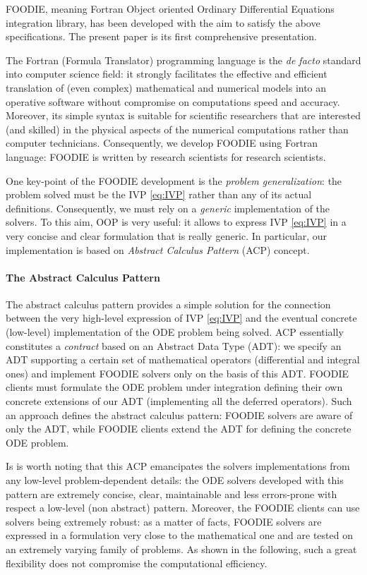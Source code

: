 FOODIE, meaning Fortran Object oriented Ordinary Differential Equations integration library, has been developed with the aim to satisfy the above specifications. The present paper is its first comprehensive presentation.

The Fortran (Formula Translator) programming language is the \emph{de facto} standard into computer science field: it strongly facilitates the effective and efficient translation of (even complex) mathematical and numerical models into an operative software without compromise on computations speed and accuracy. Moreover, its simple syntax is suitable for scientific researchers that are interested (and skilled) in the physical aspects of the numerical computations rather than computer technicians. Consequently, we develop FOODIE using Fortran language: FOODIE is written by research scientists for research scientists.

One key-point of the FOODIE development is the \emph{problem generalization}: the problem solved must be the IVP \ref{eq:IVP} rather than any of its actual definitions. Consequently, we must rely on a \emph{generic} implementation of the solvers. To this aim, OOP is very useful: it allows to express IVP \ref{eq:IVP} in a very concise and clear formulation that is really generic. In particular, our implementation is based on \emph{Abstract Calculus Pattern} (ACP) concept.

\paragraph{The Abstract Calculus Pattern}
The abstract calculus pattern provides a simple solution for the connection between the very high-level expression of IVP \ref{eq:IVP} and the eventual concrete (low-level) implementation of the ODE problem being solved. ACP essentially constitutes a \emph{contract} based on an Abstract Data Type (ADT): we specify an ADT supporting a certain set of mathematical operators (differential and integral ones) and implement FOODIE solvers only on the basis of this ADT. FOODIE clients must formulate the ODE problem under integration defining their own concrete extensions of our ADT (implementing all the deferred operators). Such an approach defines the abstract calculus pattern: FOODIE solvers are aware of only the ADT, while FOODIE clients extend the ADT for defining the concrete ODE problem.

Is is worth noting that this ACP emancipates the solvers implementations from any low-level problem-dependent details: the ODE solvers developed with this pattern are extremely concise, clear, maintainable and less errors-prone with respect a low-level (non abstract) pattern. Moreover, the FOODIE clients can use solvers being extremely robust: as a matter of facts, FOODIE solvers are expressed in a formulation very close to the mathematical one and are tested on an extremely varying family of problems. As shown in the following, such a great flexibility does not compromise the computational efficiency.

